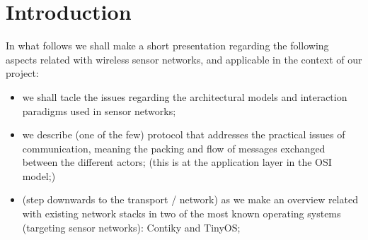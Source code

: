 
\section{Introduction}

In what follows we shall make a short presentation regarding the following aspects related with wireless sensor networks, and applicable in the context of our project:

\begin{itemize}
	\item we shall tacle the issues regarding the architectural models and interaction paradigms used in sensor networks;
	\item we describe (one of the few) protocol that addresses the practical issues of communication, meaning the packing and flow of messages exchanged between the different actors; (this is at the application layer in the OSI model;)
	\item (step downwards to the transport / network) as we make an overview related with existing network stacks in two of the most known operating systems (targeting sensor networks): Contiky and TinyOS;
\end{itemize}



